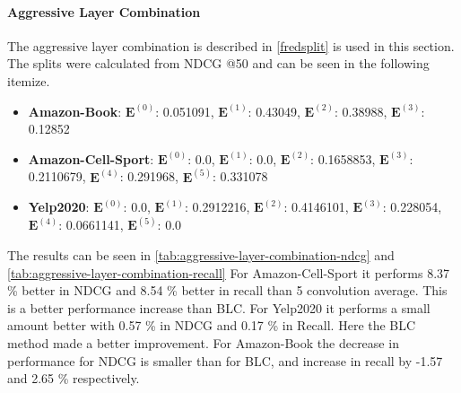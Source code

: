 \paragraph{Aggressive Layer Combination}
The aggressive layer combination is described in \autoref{fredsplit} is used in this section.
The splits were calculated from NDCG @50 and can be seen in the following itemize.
\begin{itemize}
    \item \textbf{Amazon-Book}: $\mathbf{E}^{(0)}$: 0.051091, $\mathbf{E}^{(1)}$: 0.43049, $\mathbf{E}^{(2)}$: 0.38988, $\mathbf{E}^{(3)}$:  0.12852
    \item \textbf{Amazon-Cell-Sport}: $\mathbf{E}^{(0)}$: 0.0, $\mathbf{E}^{(1)}$: 0.0, $\mathbf{E}^{(2)}$: 0.1658853, $\mathbf{E}^{(3)}$:  0.2110679, $\mathbf{E}^{(4)}$: 0.291968, $\mathbf{E}^{(5)}$: 0.331078
    \item \textbf{Yelp2020}: $\mathbf{E}^{(0)}$: 0.0, $\mathbf{E}^{(1)}$: 0.2912216, $\mathbf{E}^{(2)}$: 0.4146101, $\mathbf{E}^{(3)}$: 0.228054, $\mathbf{E}^{(4)}$: 0.0661141, $\mathbf{E}^{(5)}$: 0.0
\end{itemize}
The results can be seen in \autoref{tab:aggressive-layer-combination-ndcg} and \autoref{tab:aggressive-layer-combination-recall}
For Amazon-Cell-Sport it performs 8.37 \% better in NDCG and 8.54 \% better in recall than 5 convolution average.
This is a better performance increase than BLC.
For Yelp2020 it performs a small amount better with 0.57 \% in NDCG and 0.17 \% in Recall.
Here the BLC method made a better improvement.
For Amazon-Book the decrease in performance for NDCG is smaller than for BLC, and increase in recall by -1.57 and 2.65 \% respectively.

